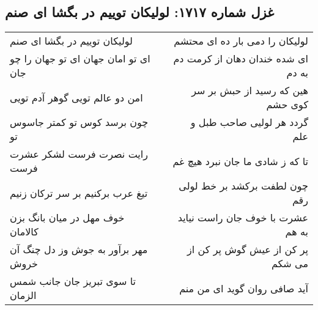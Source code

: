 \begin{center}
\section*{غزل شماره ۱۷۱۷: لولیکان توییم در بگشا ای صنم}
\label{sec:1717}
\begin{longtable}{l p{0.5cm} r}
لولیکان توییم در بگشا ای صنم
&&
لولیکان را دمی بار ده ای محتشم
\\
ای تو امان جهان ای تو جهان را چو جان
&&
ای شده خندان دهان از کرمت دم به دم
\\
امن دو عالم تویی گوهر آدم تویی
&&
هین که رسید از حبش بر سر کوی حشم
\\
چون برسد کوس تو کمتر جاسوس تو
&&
گردد هر لولیی صاحب طبل و علم
\\
رایت نصرت فرست لشکر عشرت فرست
&&
تا که ز شادی ما جان نبرد هیچ غم
\\
تیغ عرب برکنیم بر سر ترکان زنیم
&&
چون لطفت برکشد بر خط لولی رقم
\\
خوف مهل در میان بانگ بزن کالامان
&&
عشرت با خوف جان راست نیاید به هم
\\
مهر برآور به جوش وز دل چنگ آن خروش
&&
پر کن از عیش گوش پر کن از می شکم
\\
تا سوی تبریز جان جانب شمس الزمان
&&
آید صافی روان گوید ای من منم
\\
\end{longtable}
\end{center}
